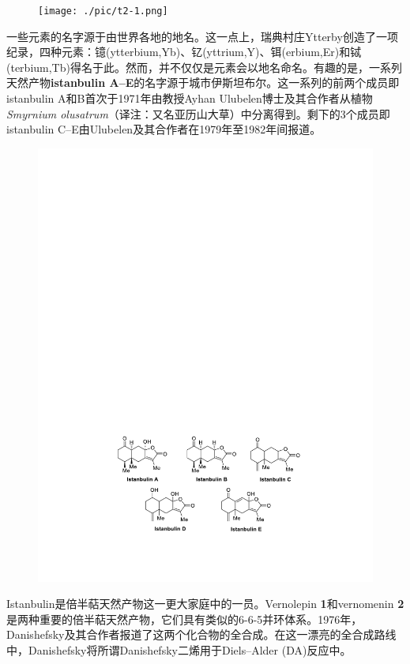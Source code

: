 \begin{figure}[h]
	\centering
	\texttt{[image: ./pic/t2-1.png]}
\end{figure}

一些元素的名字源于由世界各地的地名。这一点上，瑞典村庄Ytterby创造了一项纪录，四种元素：镱(ytterbium,Yb)、钇(yttrium,Y)、铒(erbium,Er)和铽(terbium,Tb)得名于此。然而，并不仅仅是元素会以地名命名。有趣的是，一系列天然产物\textbf{istanbulin A--E}的名字源于城市伊斯坦布尔。这一系列的前两个成员即istanbulin A和B首次于1971年由教授Ayhan Ulubelen博士及其合作者从植物\emph{Smyrnium olusatrum}（译注：又名亚历山大草）中分离得到。剩下的3个成员即istanbulin C--E由Ulubelen及其合作者在1979年至1982年间报道。

\begin{figure}[h]
	\centering
	\includegraphics[width=12cm]{./pic/t2-2.pdf}
\end{figure}

Istanbulin是倍半萜天然产物这一更大家庭中的一员。Vernolepin \textbf{1}和vernomenin \textbf{2}是两种重要的倍半萜天然产物，它们具有类似的6-6-5并环体系。1976年，Danishefsky及其合作者报道了这两个化合物的全合成。在这一漂亮的全合成路线中，Danishefsky将所谓Danishefsky二烯用于Diels--Alder (DA)反应中。

